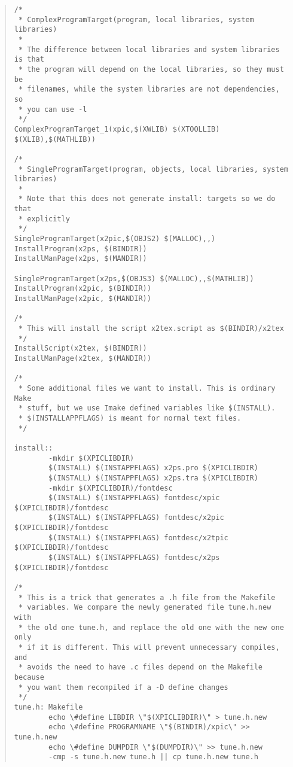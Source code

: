 \begin{quote}
\begin{verbatim}
/* 
 * ComplexProgramTarget(program, local libraries, system libraries)
 *
 * The difference between local libraries and system libraries is that
 * the program will depend on the local libraries, so they must be
 * filenames, while the system libraries are not dependencies, so 
 * you can use -l
 */
ComplexProgramTarget_1(xpic,$(XWLIB) $(XTOOLLIB) $(XLIB),$(MATHLIB))

/*
 * SingleProgramTarget(program, objects, local libraries, system libraries)
 *
 * Note that this does not generate install: targets so we do that
 * explicitly
 */
SingleProgramTarget(x2pic,$(OBJS2) $(MALLOC),,)
InstallProgram(x2ps, $(BINDIR))
InstallManPage(x2ps, $(MANDIR))

SingleProgramTarget(x2ps,$(OBJS3) $(MALLOC),,$(MATHLIB))
InstallProgram(x2pic, $(BINDIR))
InstallManPage(x2pic, $(MANDIR))

/*
 * This will install the script x2tex.script as $(BINDIR)/x2tex
 */
InstallScript(x2tex, $(BINDIR))
InstallManPage(x2tex, $(MANDIR))

/*
 * Some additional files we want to install. This is ordinary Make
 * stuff, but we use Imake defined variables like $(INSTALL).
 * $(INSTALLAPPFLAGS) is meant for normal text files.
 */

install::
        -mkdir $(XPICLIBDIR)
        $(INSTALL) $(INSTAPPFLAGS) x2ps.pro $(XPICLIBDIR)
        $(INSTALL) $(INSTAPPFLAGS) x2ps.tra $(XPICLIBDIR)
        -mkdir $(XPICLIBDIR)/fontdesc
        $(INSTALL) $(INSTAPPFLAGS) fontdesc/xpic $(XPICLIBDIR)/fontdesc
        $(INSTALL) $(INSTAPPFLAGS) fontdesc/x2pic $(XPICLIBDIR)/fontdesc
        $(INSTALL) $(INSTAPPFLAGS) fontdesc/x2tpic $(XPICLIBDIR)/fontdesc
        $(INSTALL) $(INSTAPPFLAGS) fontdesc/x2ps $(XPICLIBDIR)/fontdesc

/* 
 * This is a trick that generates a .h file from the Makefile
 * variables. We compare the newly generated file tune.h.new with
 * the old one tune.h, and replace the old one with the new one only
 * if it is different. This will prevent unnecessary compiles, and
 * avoids the need to have .c files depend on the Makefile because
 * you want them recompiled if a -D define changes
 */
tune.h: Makefile
        echo \#define LIBDIR \"$(XPICLIBDIR)\" > tune.h.new
        echo \#define PROGRAMNAME \"$(BINDIR)/xpic\" >> tune.h.new
        echo \#define DUMPDIR \"$(DUMPDIR)\" >> tune.h.new
        -cmp -s tune.h.new tune.h || cp tune.h.new tune.h
\end{verbatim}
\end{quote}

